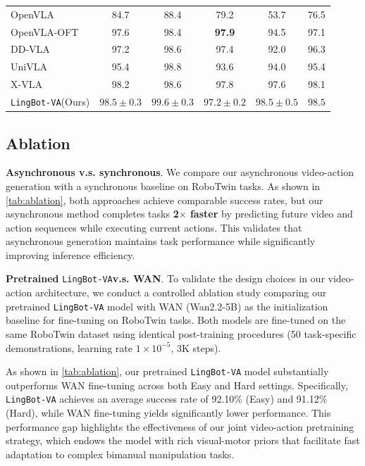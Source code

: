 \documentclass[onecolumn]{robbyant}           %
\newcommand\methodname{LingBot-VA}
\newcommand{\method}{\texttt{\methodname}\xspace}
\begin{document}
\begin{table}[t]
\begin{tabular}{l|ccccc}
OpenVLA \citep{kim2024} & 84.7 & 88.4 & 79.2 & 53.7 & 76.5 \\
OpenVLA-OFT \citep{kim2025} & 97.6 & 98.4 & \textbf{97.9} & 94.5 & 97.1 \\
DD-VLA \citep{liang2025} & 97.2 & 98.6 & 97.4 & 92.0 & 96.3 \\
UniVLA \citep{wang2025a} & 95.4 & 98.8 & 93.6 & 94.0 & 95.4 \\
X-VLA~\citep{xvla} & 98.2 & 98.6 & 97.8 & 97.6 & 98.1 \\
\midrule
 \method (Ours) & {$\mathbf{98.5\pm0.3}$} & {$\mathbf{99.6\pm 0.3 }$} & $97.2\pm 0.2 $& {$\mathbf{98.5\pm 0.5}$} & {$\mathbf{98.5}$} \\
\bottomrule
\end{tabular}
\end{table}




\subsection{Ablation}




\noindent\textbf{Asynchronous v.s. synchronous}.
We compare our asynchronous video-action generation with a synchronous baseline on RoboTwin tasks.
As shown in \cref{tab:ablation}, both approaches achieve comparable success rates, but our asynchronous method completes tasks \textbf{2$\times$ faster} by predicting future video and action sequences while executing current actions.
This validates that asynchronous generation maintains task performance while significantly improving inference efficiency.

\noindent\textbf{Pretrained} \method \textbf{v.s. WAN}.
To validate the design choices in our video-action architecture, we conduct a controlled ablation study comparing our pretrained \method model with WAN (Wan2.2-5B) as the initialization baseline for fine-tuning on RoboTwin tasks.
Both models are fine-tuned on the same RoboTwin dataset using identical post-training procedures (50 task-specific demonstrations, learning rate $1 \times 10^{-5}$, 3K steps).

As shown in \cref{tab:ablation}, our pretrained \method model substantially outperforms WAN fine-tuning across both Easy and Hard settings.
Specifically, \method achieves an average success rate of 92.10\% (Easy) and 91.12\% (Hard), while WAN fine-tuning yields significantly lower performance.
This performance gap highlights the effectiveness of our joint video-action pretraining strategy, which endows the model with rich visual-motor priors that facilitate fast adaptation to complex bimanual manipulation tasks.
\end{document}
